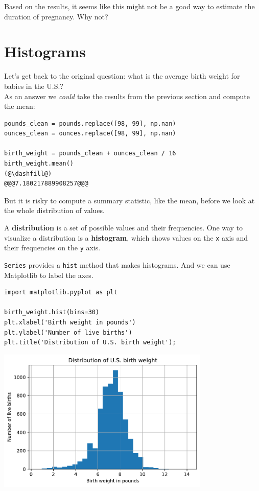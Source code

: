 Based on the results, it seems like this might not be a good way to
estimate the duration of pregnancy. Why not?

\hypertarget{histograms}{%
\section{Histograms}\label{histograms}}

Let's get back to the original question: what is the average birth
weight for babies in the U.S.?\\
As an answer we \emph{could} take the results from the previous section
and compute the mean:

\begin{lstlisting}[]
pounds_clean = pounds.replace([98, 99], np.nan)
ounces_clean = ounces.replace([98, 99], np.nan)

birth_weight = pounds_clean + ounces_clean / 16
birth_weight.mean()
(@\dashfill@)
@@@7.180217889908257@@@
\end{lstlisting}

But it is risky to compute a summary statistic, like the mean, before we
look at the whole distribution of values.

A \textbf{distribution} is a set of possible values and their
frequencies. One way to visualize a distribution is a
\textbf{histogram}, which shows values on the
\passthrough{\lstinline!x!} axis and their frequencies on the
\passthrough{\lstinline!y!} axis.

\passthrough{\lstinline!Series!} provides a
\passthrough{\lstinline!hist!} method that makes histograms. And we can
use Matplotlib to label the axes.

\begin{lstlisting}[]
import matplotlib.pyplot as plt

birth_weight.hist(bins=30)
plt.xlabel('Birth weight in pounds')
plt.ylabel('Number of live births')
plt.title('Distribution of U.S. birth weight');
\end{lstlisting}

\begin{center}
\includegraphics[width=4in]{chapters/07_dataframes_files/07_dataframes_61_0.pdf}
\end{center}


